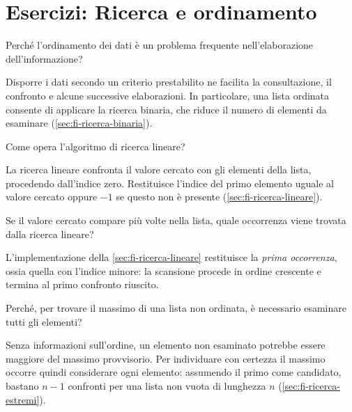 \chapter{Esercizi: Ricerca e ordinamento}
\label{chap:esercizi-ricerca-ordinamento}

\begin{exercise}
\label{ex:fi-esercizi-ricerca-ordinamento-frequenza}
Perché l'ordinamento dei dati è un problema frequente
nell'elaborazione dell'informazione?
\end{exercise}

Disporre i dati secondo un criterio prestabilito ne facilita
la consultazione, il confronto e alcune successive elaborazioni.
In particolare, una lista ordinata consente di applicare la
ricerca binaria, che riduce il numero di elementi da esaminare
(\cref{sec:fi-ricerca-binaria}).

\begin{exercise}
\label{ex:fi-esercizi-ricerca-ordinamento-ricerca-lineare}
Come opera l'algoritmo di ricerca lineare?
\end{exercise}

La ricerca lineare confronta il valore cercato con gli elementi
della lista, procedendo dall'indice zero. Restituisce l'indice
del primo elemento uguale al valore cercato oppure \(-1\) se
questo non è presente (\cref{sec:fi-ricerca-lineare}).

\begin{exercise}
\label{ex:fi-esercizi-ricerca-ordinamento-occorrenza}
Se il valore cercato compare più volte nella lista, quale
occorrenza viene trovata dalla ricerca lineare?
\end{exercise}

L'implementazione della \cref{sec:fi-ricerca-lineare} restituisce
la \emph{prima occorrenza}, ossia quella con l'indice minore:
la scansione procede in ordine crescente e termina al primo
confronto riuscito.

\begin{exercise}
\label{ex:fi-esercizi-ricerca-ordinamento-massimo-scansione}
Perché, per trovare il massimo di una lista non ordinata,
è necessario esaminare tutti gli elementi?
\end{exercise}

Senza informazioni sull'ordine, un elemento non esaminato
potrebbe essere maggiore del massimo provvisorio. Per
individuare con certezza il massimo occorre quindi considerare
ogni elemento: assumendo il primo come candidato, bastano
\(n-1\) confronti per una lista non vuota di lunghezza \(n\)
(\cref{sec:fi-ricerca-estremi}).

